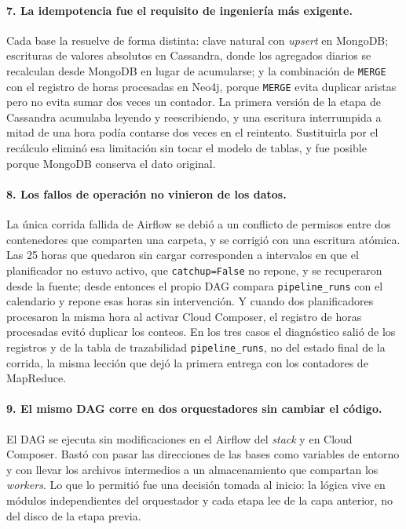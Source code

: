 \paragraph{7. La idempotencia fue el requisito de ingeniería más exigente.} Cada base la resuelve de forma distinta: clave natural con \textit{upsert} en MongoDB; escrituras de valores absolutos en Cassandra, donde los agregados diarios se recalculan desde MongoDB en lugar de acumularse; y la combinación de \texttt{MERGE} con el registro de horas procesadas en Neo4j, porque \texttt{MERGE} evita duplicar aristas pero no evita sumar dos veces un contador. La primera versión de la etapa de Cassandra acumulaba leyendo y reescribiendo, y una escritura interrumpida a mitad de una hora podía contarse dos veces en el reintento. Sustituirla por el recálculo eliminó esa limitación sin tocar el modelo de tablas, y fue posible porque MongoDB conserva el dato original.

\paragraph{8. Los fallos de operación no vinieron de los datos.} La única corrida fallida de Airflow se debió a un conflicto de permisos entre dos contenedores que comparten una carpeta, y se corrigió con una escritura atómica. Las 25 horas que quedaron sin cargar corresponden a intervalos en que el planificador no estuvo activo, que \texttt{catchup=False} no repone, y se recuperaron desde la fuente; desde entonces el propio DAG compara \texttt{pipeline\_runs} con el calendario y repone esas horas sin intervención. Y cuando dos planificadores procesaron la misma hora al activar Cloud Composer, el registro de horas procesadas evitó duplicar los conteos. En los tres casos el diagnóstico salió de los registros y de la tabla de trazabilidad \texttt{pipeline\_runs}, no del estado final de la corrida, la misma lección que dejó la primera entrega con los contadores de MapReduce.

\paragraph{9. El mismo DAG corre en dos orquestadores sin cambiar el código.} El DAG se ejecuta sin modificaciones en el Airflow del \textit{stack} y en Cloud Composer. Bastó con pasar las direcciones de las bases como variables de entorno y con llevar los archivos intermedios a un almacenamiento que compartan los \textit{workers}. Lo que lo permitió fue una decisión tomada al inicio: la lógica vive en módulos independientes del orquestador y cada etapa lee de la capa anterior, no del disco de la etapa previa.


